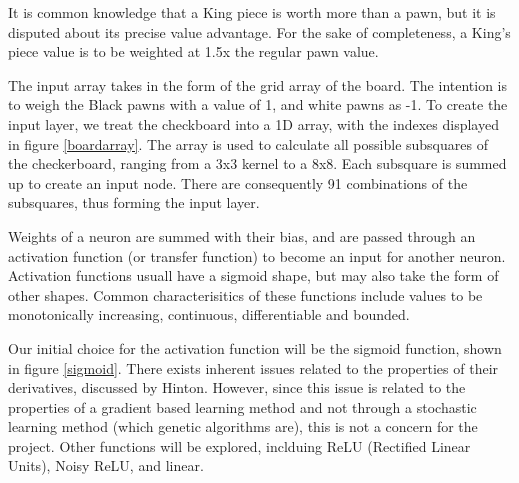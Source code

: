 \documentclass[12pt,a4paper]{article}
\begin{document}
    It is common knowledge that a King piece is worth more than a pawn, but it is disputed about its precise value advantage. For the sake of completeness, a King's piece value is to be weighted at 1.5x the regular pawn value. 

    The input array takes in the form of the grid array of the board. The intention is to weigh the Black pawns with a value of 1, and white pawns as -1. To create the input layer, we treat the checkboard into a 1D array, with the indexes displayed in figure \ref{boardarray}. The array is used to calculate all possible subsquares of the checkerboard, ranging from a 3x3 kernel to a 8x8. Each subsquare is summed up to create an input node. There are consequently 91 combinations of the subsquares, thus forming the input layer. 
    
    
    Weights of a neuron are summed with their bias, and are passed through an activation function (or transfer function) to become an input for another neuron. Activation functions usuall have a sigmoid shape, but may also take the form of other shapes. Common characterisitics of these functions include values to be monotonically increasing, continuous, differentiable and bounded.

    Our initial choice for the activation function will be the sigmoid function, shown in figure \ref{sigmoid}. There exists inherent issues related to the properties of their derivatives, discussed by Hinton. However, since this issue is related to the properties of a gradient based learning method and not through a stochastic learning method (which genetic algorithms are), this is not a concern for the project. Other functions will be explored, inclduing ReLU (Rectified Linear Units), Noisy ReLU, and linear.
\end{document}
